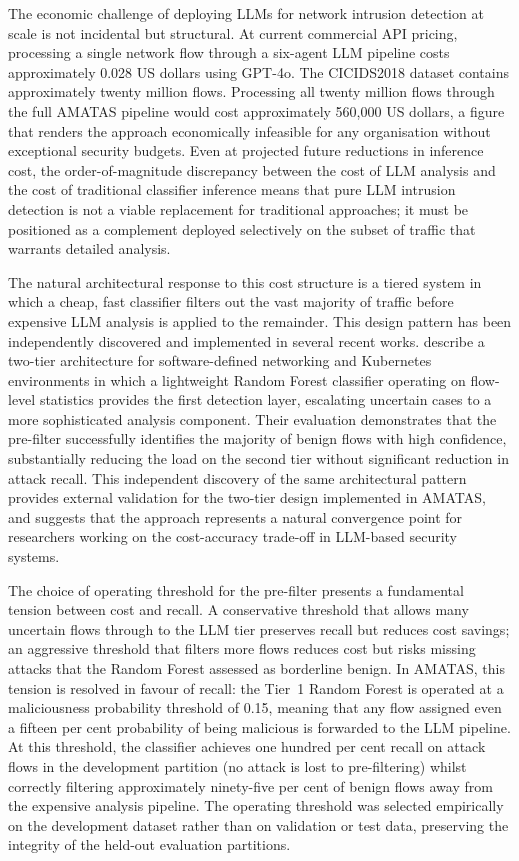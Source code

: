 The economic challenge of deploying LLMs for network intrusion detection at scale is not incidental but structural. At current commercial API pricing, processing a single network flow through a six-agent LLM pipeline costs approximately 0.028 US dollars using GPT-4o. The CICIDS2018 dataset contains approximately twenty million flows. Processing all twenty million flows through the full AMATAS pipeline would cost approximately 560,000 US dollars, a figure that renders the approach economically infeasible for any organisation without exceptional security budgets. Even at projected future reductions in inference cost, the order-of-magnitude discrepancy between the cost of LLM analysis and the cost of traditional classifier inference means that pure LLM intrusion detection is not a viable replacement for traditional approaches; it must be positioned as a complement deployed selectively on the subset of traffic that warrants detailed analysis.

The natural architectural response to this cost structure is a tiered system in which a cheap, fast classifier filters out the vast majority of traffic before expensive LLM analysis is applied to the remainder. This design pattern has been independently discovered and implemented in several recent works. \textcite{Kalafatidis2025} describe a two-tier architecture for software-defined networking and Kubernetes environments in which a lightweight Random Forest classifier operating on flow-level statistics provides the first detection layer, escalating uncertain cases to a more sophisticated analysis component. Their evaluation demonstrates that the pre-filter successfully identifies the majority of benign flows with high confidence, substantially reducing the load on the second tier without significant reduction in attack recall. This independent discovery of the same architectural pattern provides external validation for the two-tier design implemented in AMATAS, and suggests that the approach represents a natural convergence point for researchers working on the cost-accuracy trade-off in LLM-based security systems.

The choice of operating threshold for the pre-filter presents a fundamental tension between cost and recall. A conservative threshold that allows many uncertain flows through to the LLM tier preserves recall but reduces cost savings; an aggressive threshold that filters more flows reduces cost but risks missing attacks that the Random Forest assessed as borderline benign. In AMATAS, this tension is resolved in favour of recall: the Tier~1 Random Forest is operated at a maliciousness probability threshold of 0.15, meaning that any flow assigned even a fifteen per cent probability of being malicious is forwarded to the LLM pipeline. At this threshold, the classifier achieves one hundred per cent recall on attack flows in the development partition (no attack is lost to pre-filtering) whilst correctly filtering approximately ninety-five per cent of benign flows away from the expensive analysis pipeline. The operating threshold was selected empirically on the development dataset rather than on validation or test data, preserving the integrity of the held-out evaluation partitions.

